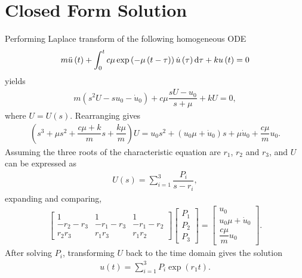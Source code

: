 \appendix
\section{Closed Form Solution}
Performing Laplace transform of the following homogeneous ODE
\begin{gather}\label{eq:single_exp}
m\ddot{u}\left(t\right)+\int_0^tc\mu\exp\left(-\mu\left(t-\tau\right)\right)\dot{u}\left(\tau\right)\mathrm{d}\tau+ku\left(t\right)=0
\end{gather}
yields
\begin{gather}
m\left(s^2U-su_0-\dot{u}_0\right)
+c\mu\dfrac{sU-u_0}{s+\mu}
+kU
=0,
\end{gather}
where $U=U\left(s\right)$. Rearranging gives
\begin{gather}
\left(
s^3
+\mu{}s^2
+\dfrac{c\mu+k}{m}s
+\dfrac{k\mu}{m}\right)U
=
u_0s^2
+\left(u_0\mu+\dot{u}_0\right)s
+\mu\dot{u}_0
+\dfrac{c\mu{}}{m}u_0.
\end{gather}
Assuming the three roots of the characteristic equation are $r_1$, $r_2$ and $r_3$, and $U$ can be expressed as
\begin{gather}
U\left(s\right)=\sum_{i=1}^3\dfrac{P_i}{s-r_i},
\end{gather}
expanding and comparing,
\begin{gather}
\begin{bmatrix}
1&1&1\\
-r_2-r_3&-r_1-r_3&-r_1-r_2\\
r_2r_3&r_1r_3&r_1r_2
\end{bmatrix}
\begin{bmatrix}
P_1\\P_2\\P_3
\end{bmatrix}
=
\begin{bmatrix}
u_0\\u_0\mu+\dot{u}_0\\\dfrac{c\mu{}}{m}u_0
\end{bmatrix}.
\end{gather}
After solving $P_i$, transforming $U$ back to the time domain gives the solution
\begin{gather}
u(t)=\sum_{i=1}^3P_i\exp\left(r_1t\right).
\end{gather}

